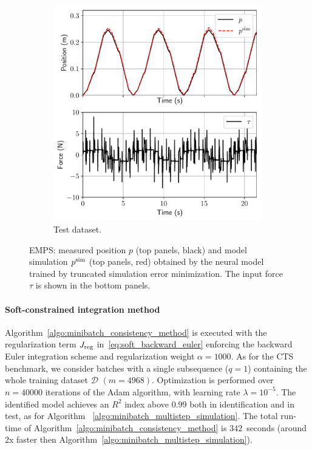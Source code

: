 \documentclass{article} %
\newcommand{\batchsize}{q}
\newcommand{\seqlen}{m}
\newcommand{\numiter}{n}
\newcommand{\Did}{{\mathcal{D}}}
\begin{document}
\begin{figure}
\begin{subfigure}{.5\textwidth}
   \includegraphics[width=\linewidth]{fig/EMPS/EMPS_SS_test_model_SS_64step_RK.pdf}
   \caption{Test dataset.}
   \label{fig:sub2}
 \end{subfigure}
  \caption{EMPS: measured position $p$ (top panels, black) and model simulation $p^{\rm sim}$ (top panels, red) obtained by the neural model trained by truncated simulation error minimization. The input force $\tau$ is shown in the bottom panels.} \label{fig:EMPS}
 \end{figure}

\paragraph{Soft-constrained integration method}
Algorithm~\ref{algo:minibatch_consistency_method} is executed with the regularization term $J_{\rm reg}$ in~\eqref{eq:soft_backward_euler} enforcing the backward Euler integration scheme and regularization weight $\alpha=1000$. As for the CTS benchmark, we consider batches with a single subsequence ($\batchsize=1$) containing the whole training dataset $\Did$ $(\seqlen = 4968)$. 
Optimization is performed over $\numiter=40000$ iterations of the Adam algorithm, with learning rate $\lambda=10^{-5}$. 
The identified model achieves an $R^2$ index above $0.99$ both in identification and in test, as for Algorithm~ \ref{algo:minibatch_multistep_simulation}.
 The total run-time of Algorithm~\ref{algo:minibatch_consistency_method} is $ 342$~seconds (around 2x faster then Algorithm~\ref{algo:minibatch_multistep_simulation}).
\end{document}
